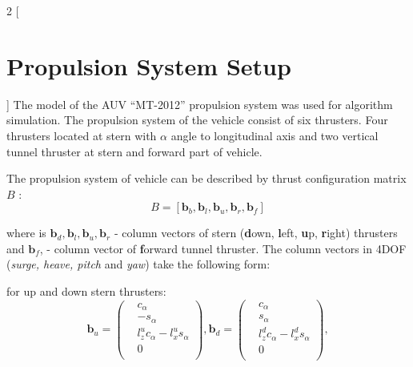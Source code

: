 \documentclass[a0,portrait]{a0poster}
\begin{document}
\vspace{1.5cm}
\begin{minipage}[t]{0.48\linewidth}
\begin{multicols}{2}
[
\section*{Propulsion System Setup}
]
The model of the AUV ``MT-2012'' \cite{auv_mt} propulsion system was used for algorithm simulation.
The propulsion system of the vehicle consist of six thrusters. Four thrusters located at stern with $\alpha$ angle to longitudinal axis and two vertical tunnel thruster at stern and forward part of vehicle. %

The propulsion system of vehicle can be described by thrust configuration matrix $B$ \cite{book_fossen}:
\begin{equation*}
B = [\boldsymbol{b}_b, \boldsymbol{b}_l, \boldsymbol{b}_u, \boldsymbol{b}_r, \boldsymbol{b}_f]
\end{equation*}

where is $\boldsymbol{b}_d, \boldsymbol{b}_l, \boldsymbol{b}_u, \boldsymbol{b}_r$ - column vectors of stern (\textbf{d}own, \textbf{l}eft, \textbf{u}p, \textbf{r}ight) thrusters and $\boldsymbol{b}_f$,  - column vector of \textbf{f}orward tunnel thruster.
The column vectors in 4DOF (\textit{surge, heave, pitch} and \textit{yaw}) take the following form:

for up and down stern thrusters:
\begin{equation*}
\boldsymbol{b}_u = \left( \begin{array}{cc}
 & c_{\alpha} \\
 & -s_{\alpha} \\
 & l_z^u c_{\alpha} - l_x^u s_{\alpha} \\
 & 0 \\
\end{array}
\right),
\boldsymbol{b}_d = \left( \begin{array}{cc}
& c_{\alpha} \\
& s_{\alpha}   \\
& l_z^d c_{\alpha} - l_x^d s_{\alpha} \\
& 0 \\
\end{array}
\right),
\end{equation*}


\end{multicols}
\end{minipage}
\end{document}

